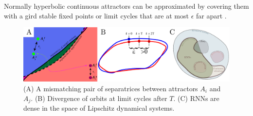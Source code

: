 \documentclass[10pt]{article}
\begin{document}
Normally hyperbolic continuous attractors can be approximated by covering them with a gird stable fixed points or limit cycles that are at most $\epsilon$ far apart \citep{Sagodi2024a}.

\begin{figure}[tbhp]
  \centering
  \includegraphics[width=\textwidth]{icmns2025_figure}
  \caption{(A) 	A mismatching pair of separatrices between attractors $A_i$ and $A_j$.
  		(B) Divergence of orbits at limit cycles after $T$.
  		(C) RNNs are dense in the space of Lipschitz dynamical systems.
  }\label{fig:figure}
\end{figure}


\end{document}
